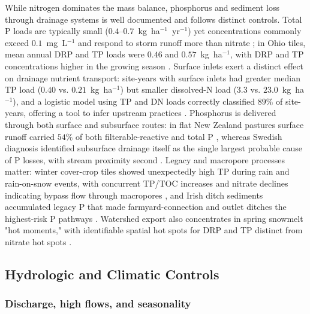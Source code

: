 \documentclass[11pt]{article}
\begin{document}
While nitrogen dominates the mass balance, phosphorus and sediment loss
through drainage systems is well documented and follows distinct
controls. Total P loads are typically small ($0.4$--$0.7$~kg~ha$^{-1}$~yr$^{-1}$)
yet concentrations commonly exceed $0.1$~mg~L$^{-1}$ and respond to storm
runoff more than nitrate \parencite{Tomer2008}; in Ohio tiles, mean annual
DRP and TP loads were $0.46$ and $0.57$~kg~ha$^{-1}$, with DRP and TP
concentrations higher in the growing season \parencite{King2016}. Surface
inlets exert a distinct effect on drainage nutrient transport: site-years
with surface inlets had greater median TP load ($0.40$ vs.
$0.21$~kg~ha$^{-1}$) but smaller dissolved-N load ($3.3$ vs.
$23.0$~kg~ha$^{-1}$), and a logistic model using TP and DN loads correctly
classified $89\%$ of site-years, offering a tool to infer upstream
practices \parencite{Flores2021}. Phosphorus is delivered through both
surface and subsurface routes: in flat New Zealand pastures surface runoff
carried $54\%$ of both filterable-reactive and total P
\parencite{Monaghan2016}, whereas Swedish diagnosis identified subsurface
drainage itself as the single largest probable cause of P losses, with
stream proximity second \parencite{Djodjic2002}. Legacy and macropore
processes matter: winter cover-crop tiles showed unexpectedly high TP
during rain and rain-on-snow events, with concurrent TP/TOC increases and
nitrate declines indicating bypass flow through macropores
\parencite{McNeill2026}, and Irish ditch sediments accumulated legacy P
that made farmyard-connection and outlet ditches the highest-risk P
pathways \parencite{Moloney2020,Opoku2024}. Watershed export
also concentrates in spring snowmelt "hot moments," with identifiable
spatial hot spots for DRP and TP distinct from nitrate hot spots
\parencite{Irvine2019}.

\subsection{Hydrologic and Climatic Controls}

\subsubsection{Discharge, high flows, and seasonality}
\end{document}
